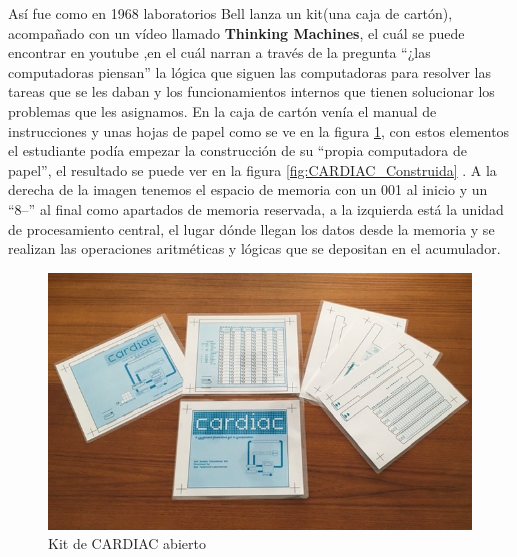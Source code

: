 \documentclass[letterpaper,12pt,oneside]{book}
\begin{document}
		Así fue como en 1968 laboratorios Bell lanza un kit(una caja de cartón), acompañado con un vídeo llamado \textbf{Thinking Machines}, el
		cuál se puede encontrar en youtube \cite{att_tech_channel_att_2012} ,en el cuál narran
		a través de la pregunta ``¿las computadoras piensan'' la lógica que siguen las computadoras para resolver las tareas que se les daban y los funcionamientos
		internos que tienen solucionar los problemas que les asignamos. En la caja de cartón venía el manual de instrucciones 
		\cite{david_hegelbarger_instruction_1968} y unas hojas de papel como se ve en la figura \ref{fig:Kit_CARDIAC}, con estos elementos el 
		estudiante podía empezar la construcción de su ``propia computadora de papel'', el resultado se puede ver en la figura \ref{fig:CARDIAC_Construida} 
		\cite{megardi_cardiac_nodate}.
		A la derecha de la imagen tenemos el espacio de memoria con un 001 al inicio y un ``8--'' al final como apartados de memoria reservada, a la izquierda
		está la unidad de procesamiento central, el lugar dónde llegan los datos desde la memoria y se realizan las operaciones aritméticas y lógicas
		que se depositan en el acumulador.
		
		\begin{figure}[h]
			\includegraphics[scale=0.3]{media/CARDIAC_Paper/paper1.jpg}
			\caption{Kit de CARDIAC abierto}
			\label{fig:Kit_CARDIAC}
		\end{figure}
		
\end{document}
